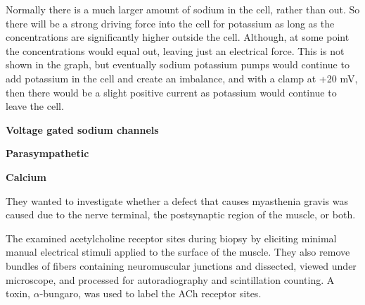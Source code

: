 \documentclass[plain,basic]{inVerba-notes}
\begin{document}
\begin{enumerate}
\begin{center}
  \end{center}

  Normally there is a much larger amount of sodium in the cell, rather than out. So there will be a strong driving force into the cell for potassium as long as the concentrations are significantly higher outside the cell. Although, at some point the concentrations would equal out, leaving just an electrical force. This is not shown in the graph, but eventually sodium potassium pumps would continue to add potassium in the cell and create an imbalance, and with a clamp at +20 mV, then there would be a slight positive current as potassium would continue to leave the cell.


  \textbf{Voltage gated sodium channels}
  

  \textbf{Parasympathetic}
  
  
  \textbf{Calcium}

  

  They wanted to investigate whether a defect that causes myasthenia gravis was caused due to the nerve terminal, the postsynaptic region of the muscle, or both. 
  

  The examined acetylcholine receptor sites during biopsy by eliciting minimal manual electrical stimuli applied to the surface of the muscle. They also remove bundles of fibers containing neuromuscular junctions and dissected, viewed under microscope, and processed for autoradiography and scintillation counting. A toxin, \(\alpha \)-bungaro, was used to label the ACh receptor sites.


\end{enumerate}
\end{document}
